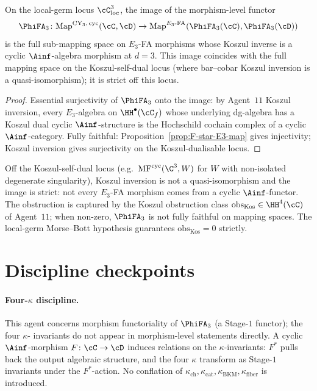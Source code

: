 \begin{proposition}
\label{prop:image-morphisms-phi-fa-3}
\ClaimStatusProvedHere
On the local-germ locus $\cC_{\mathrm{loc}}^3$, the image of the
morphism-level functor
\[
  \PhiFA_3 \colon
  \mathrm{Map}^{\mathrm{CY}_3,\,\mathrm{cyc}}(\cC, \cD)
  \to
  \mathrm{Map}^{E_3\text{-FA}}(\PhiFA_3(\cC), \PhiFA_3(\cD))
\]
is the full sub-mapping space on $E_3$-FA morphisms whose Koszul
inverse is a cyclic $\Ainf$-algebra morphism at $d = 3$.  This image
coincides with the full mapping space on the Koszul-self-dual locus
(where bar--cobar Koszul inversion is a quasi-isomorphism); it is
strict off this locus.
\end{proposition}

\begin{proof}[Proof]
Essential surjectivity of $\PhiFA_3$ onto the image: by Agent~$11$
Koszul inversion, every $E_3$-algebra on $\HH^\bullet(\cC_f)$ whose
underlying dg-algebra has a Koszul dual cyclic $\Ainf$-structure is
the Hochschild cochain complex of a cyclic $\Ainf$-category.  Fully
faithful: Proposition~\ref{prop:F-star-E3-map} gives injectivity;
Koszul inversion gives surjectivity on the Koszul-dualisable locus.
\end{proof}

\begin{remark}
\label{rem:off-koszul-self-dual}
Off the Koszul-self-dual locus (e.g.\ $\mathrm{MF}^{\mathrm{cyc}}(\C^3, W)$
for $W$ with non-isolated degenerate singularity), Koszul inversion is
not a quasi-isomorphism and the image is strict: not every
$E_3$-FA morphism comes from a cyclic $\Ainf$-functor.  The obstruction
is captured by the Koszul obstruction class $\mathrm{obs}_{\mathrm{Kos}}
\in \HH^4(\cC)$ of Agent~$11$; when non-zero, $\PhiFA_3$ is not fully
faithful on mapping spaces.  The local-germ Morse--Bott hypothesis
guarantees $\mathrm{obs}_{\mathrm{Kos}} = 0$ strictly.
\end{remark}


\section*{Discipline checkpoints}

\paragraph{Four-$\kappa$ discipline.}  This agent concerns morphism
functoriality of $\PhiFA_3$ (a Stage-$1$ functor); the four $\kappa$-
invariants do not appear in morphism-level statements directly.  A
cyclic $\Ainf$-morphism $F \colon \cC \to \cD$ induces relations on
the $\kappa$-invariants: $F^*$ pulls back the output algebraic
structure, and the four $\kappa$ transform as Stage-$1$ invariants
under the $F^*$-action.  No conflation of $\kappa_{\mathrm{ch}},
\kappa_{\mathrm{cat}}, \kappa_{\mathrm{BKM}}, \kappa_{\mathrm{fiber}}$
is introduced.

